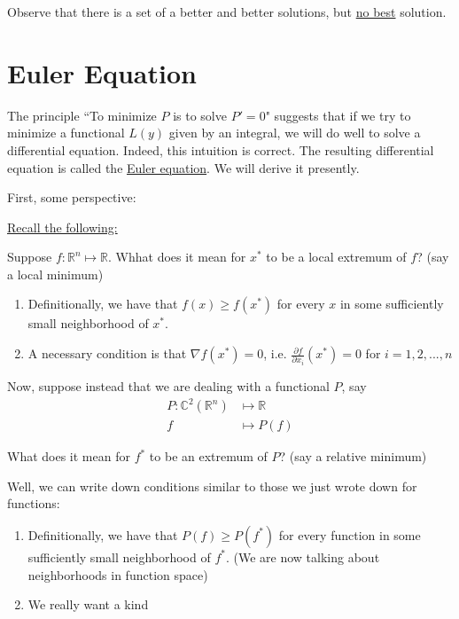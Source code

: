 Observe that there is a set of a better and better solutions, but \underline{no best} solution. 

\section{Euler Equation}
\label{section:euler_equation}

The principle ``To minimize $P$ is to solve $P' = 0 $" suggests that if we try to minimize a functional $L(y)$ given by an integral, we will do well to solve a differential equation. 
Indeed, this intuition is correct. 
The resulting differential equation is called the \underline{Euler equation}. 
We will derive it presently. 

\noindent First, some perspective:

\underline{Recall the following:}

Suppose $f: \mathbb{R}^n \mapsto \mathbb{R}$. Whhat does it mean for $x^*$ to be a local extremum of $f$? (say a local minimum)

\begin{enumerate}
    \item Definitionally, we have that $f(x) \geq f(x^*)$ for every $x$ in some sufficiently small neighborhood of $x^*$. 
    
    \item A necessary condition is that $\nabla f(x^*) = 0$, i.e. $\frac{\partial f}{\partial x_i} (x^*) = 0$ for $i = 1, 2, ... , n$
\end{enumerate}


Now, suppose instead that we are dealing with a functional $P$, say
\begin{align*}
    P: \mathbb{C}^2(\mathbb{R}^n) &\mapsto \mathbb{R}\\
    f &\mapsto P(f)
\end{align*}

What does it mean for $f^*$ to be an extremum of $P$? (say a relative minimum)

Well, we can write down conditions similar to those we just wrote down for functions:

\begin{enumerate}
    \item Definitionally, we have that $P(f) \geq P(f^*)$ for every function in some sufficiently small neighborhood of $f^*$. (We are now talking about neighborhoods in function space) 
    
    \item We really want a kind 
\end{enumerate}

